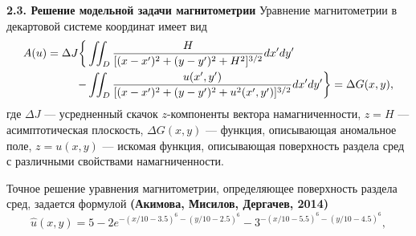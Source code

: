 \documentclass[10pt,pdf, mathserif, hyperref={unicode}]{beamer}
\begin{document}
\begin{frame}{\small\textbf{2.3. Решение модельной задачи магнитометрии}}
	Уравнение магнитометрии в декартовой системе координат имеет вид
	\begin{equation*}\begin{aligned}
	A(u)=\Delta J  \bigg\{&\iint_{D} \frac{H}{[(x-x')^2+(y-y')^2+H^2]^{3/2}}dx'dy' \notag\\
	- &\iint_{D} \frac{u(x',y')}{[(x-x')^2+(y-y')^2+u^2(x',y')]^{3/2}}dx'dy' \bigg\}=\Delta G(x,y),
	\end{aligned} \end{equation*}
	где $\Delta J$ --- усредненный скачок $z$-компоненты вектора намагниченности, $z=H$ --- асимптотическая плоскость, $\Delta G(x,y)$ --- функция, описывающая аномальное поле, $z=u(x,y)$ --- искомая функция, описывающая поверхность раздела сред с различными свойствами намагниченности.
	
	\smallskip
	Точное решение уравнения магнитометрии, определяющее поверхность раздела сред, задается формулой \textbf{\color{red}(Акимова, Мисилов, Дергачев, 2014)}
	\begin{equation*}
	\hat{u}(x,y)=5-2e^{-(x/10-3.5)^6-(y/10-2.5)^6}-3^{-(x/10-5.5)^6-(y/10-4.5)^6},
	\end{equation*}
%	
\end{frame}
\end{document}
